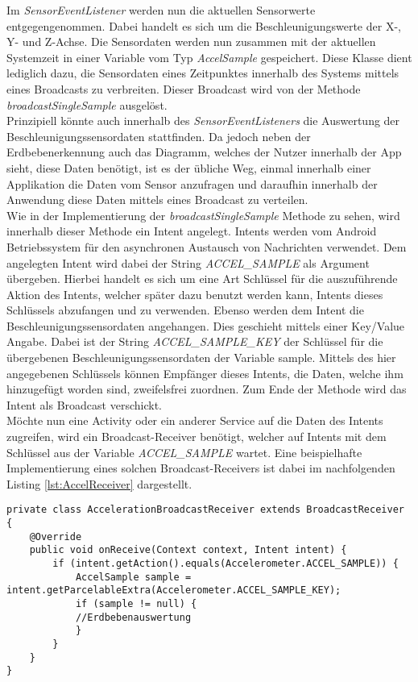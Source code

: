 Im \textit{SensorEventListener} werden nun die aktuellen Sensorwerte entgegengenommen. Dabei handelt es sich um die Beschleunigungswerte der X-, Y- und Z-Achse. Die Sensordaten werden nun zusammen mit der aktuellen Systemzeit in einer Variable vom Typ \textit{AccelSample} gespeichert. Diese Klasse dient lediglich dazu, die Sensordaten eines Zeitpunktes innerhalb des Systems mittels eines Broadcasts zu verbreiten. Dieser Broadcast wird von der Methode \textit{broadcastSingleSample} ausgelöst.\\
Prinzipiell könnte auch innerhalb des \textit{SensorEventListeners} die Auswertung der Beschleunigungssensordaten stattfinden. Da jedoch neben der Erdbebenerkennung auch das Diagramm, welches der Nutzer innerhalb der App sieht, diese Daten benötigt, ist es der übliche Weg, einmal innerhalb einer Applikation die Daten vom Sensor anzufragen und daraufhin innerhalb der Anwendung diese Daten mittels eines Broadcast zu verteilen.\\
Wie in der Implementierung der \textit{broadcastSingleSample} Methode zu sehen, wird innerhalb dieser Methode ein Intent angelegt. Intents werden vom Android Betriebssystem für den asynchronen Austausch von Nachrichten verwendet. Dem angelegten Intent wird dabei der String \textit{ACCEL\_SAMPLE} als Argument übergeben. Hierbei handelt es sich um eine Art Schlüssel für die auszuführende Aktion des Intents, welcher später dazu benutzt werden kann, Intents dieses Schlüssels abzufangen und zu verwenden. Ebenso werden dem Intent die Beschleunigungssensordaten angehangen. Dies geschieht mittels einer Key/Value Angabe. Dabei ist der String \textit{ACCEL\_SAMPLE\_KEY} der Schlüssel für die übergebenen Beschleunigungssensordaten der Variable sample. Mittels des hier angegebenen Schlüssels können Empfänger dieses Intents, die Daten, welche ihm hinzugefügt worden sind, zweifelsfrei zuordnen. Zum Ende der Methode wird das Intent als Broadcast verschickt.\\
Möchte nun eine Activity oder ein anderer Service auf die Daten des Intents zugreifen, wird ein Broadcast-Receiver benötigt, welcher auf Intents mit dem Schlüssel aus der Variable \textit{ACCEL\_SAMPLE} wartet. Eine beispielhafte Implementierung eines solchen Broadcast-Receivers ist dabei im nachfolgenden Listing \ref{lst:AccelReceiver} dargestellt.
\begin{lstlisting}[caption={Broadcast-Receiver zum Auslesen der Beschleunigungssensordaten},label=lst:AccelReceiver]
private class AccelerationBroadcastReceiver extends BroadcastReceiver {
	@Override
	public void onReceive(Context context, Intent intent) {
		if (intent.getAction().equals(Accelerometer.ACCEL_SAMPLE)) {
			AccelSample sample = intent.getParcelableExtra(Accelerometer.ACCEL_SAMPLE_KEY);
			if (sample != null) {
			//Erdbebenauswertung
			}
		}
	}
}
\end{lstlisting}
